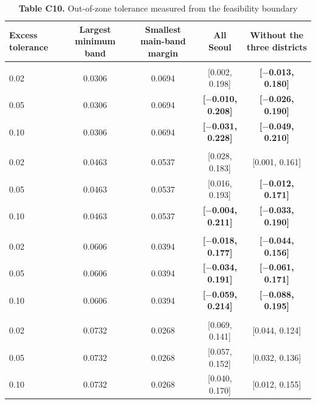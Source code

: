 \begin{table}[!htbp]
\centering
\footnotesize
\setlength{\tabcolsep}{3.5pt}
\caption*{\textbf{Table C10.} Out-of-zone tolerance measured from the feasibility boundary}
\begin{tabularx}{\linewidth}{lCCCC}
\toprule
Excess tolerance & Largest minimum band & Smallest main-band margin & All Seoul & Without the three districts \\
\midrule
\addlinespace[3pt] \\
0.02 & 0.0306 & 0.0694 & [0.002, 0.198] & \textbf{[$-$0.013, 0.180]} \\
0.05 & 0.0306 & 0.0694 & \textbf{[$-$0.010, 0.208]} & \textbf{[$-$0.026, 0.190]} \\
0.10 & 0.0306 & 0.0694 & \textbf{[$-$0.031, 0.228]} & \textbf{[$-$0.049, 0.210]} \\
\addlinespace[3pt] \\
0.02 & 0.0463 & 0.0537 & [0.028, 0.183] & [0.001, 0.161] \\
0.05 & 0.0463 & 0.0537 & [0.016, 0.193] & \textbf{[$-$0.012, 0.171]} \\
0.10 & 0.0463 & 0.0537 & \textbf{[$-$0.004, 0.211]} & \textbf{[$-$0.033, 0.190]} \\
\addlinespace[3pt] \\
0.02 & 0.0606 & 0.0394 & \textbf{[$-$0.018, 0.177]} & \textbf{[$-$0.044, 0.156]} \\
0.05 & 0.0606 & 0.0394 & \textbf{[$-$0.034, 0.191]} & \textbf{[$-$0.061, 0.171]} \\
0.10 & 0.0606 & 0.0394 & \textbf{[$-$0.059, 0.214]} & \textbf{[$-$0.088, 0.195]} \\
\addlinespace[3pt] \\
0.02 & 0.0732 & 0.0268 & [0.069, 0.141] & [0.044, 0.124] \\
0.05 & 0.0732 & 0.0268 & [0.057, 0.152] & [0.032, 0.136] \\
0.10 & 0.0732 & 0.0268 & [0.040, 0.170] & [0.012, 0.155] \\
\bottomrule
\end{tabularx}
\par{}
\end{table}
